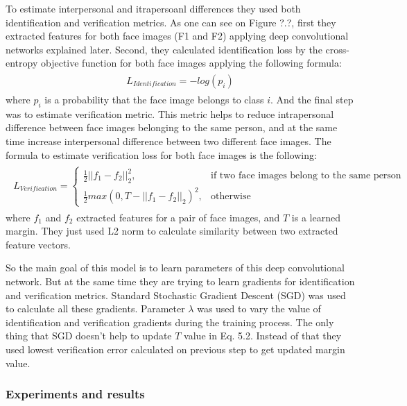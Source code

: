 \documentclass[paper=a4, fontsize=11pt]{scrartcl} %
\numberwithin{equation}{section} %
\numberwithin{figure}{section} %
\numberwithin{table}{section} %
\begin{document}
To estimate interpersonal and itrapersoanl differences they used both identification and verification metrics. As one can see on Figure ?.?, first they extracted features for both face images (F1 and F2) applying deep convolutional networks explained later. Second, they calculated identification loss by the cross-entropy objective function for both face images applying the following formula: 
	\begin{align}
	\begin{split}
		 L_{Identification} = - log (p_i) 
	\end{split}
	\end{align}
where $p_i$ is a probability that the face image belongs to class $i$. And the final step was to estimate verification metric. This metric helps to reduce intrapersonal difference between face images belonging to the same person, and at the same time increase interpersonal difference between two different face images. The formula to estimate verification loss for both face images is the following:
	\begin{align}
	\begin{split}
		 L_{Verification}= 
			\begin{cases}
    					\frac{1}{2}||f_1 - f_2||_2^2,& \text{if two face images belong to the  same person} \\
    					\frac{1}{2}max(0,T - ||f_1 - f_2||_2)^2,              & \text{otherwise}
			\end{cases}
	\end{split}
	\end{align} 
where $f_1$ and $f_2$ extracted features for a pair of face images, and $T$ is a learned margin. They just used L2 norm to calculate similarity between two extracted feature vectors. \par

So the main goal of this model is to learn parameters of this deep convolutional network. But at the same time they are trying to learn gradients for identification and verification metrics. Standard Stochastic Gradient Descent (SGD) was used to calculate all these gradients. Parameter $\lambda$ was used to vary the value of identification and verification gradients during the training process. The only thing that SGD doesn't help to update $T$ value in Eq. 5.2. Instead of that they used lowest verification error calculated on previous step to get updated margin value.

\subsubsection{Experiments and results}
\end{document}
